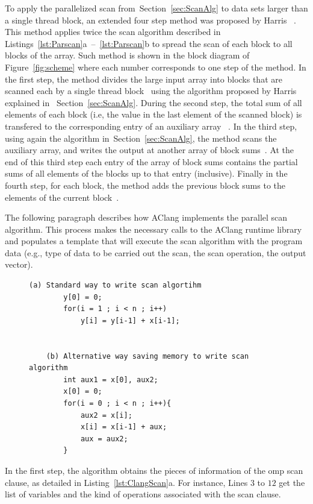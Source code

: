 \documentclass[Ingles]{ic-tese-v1}
\newcommand{\rsec}[1]{Section~\ref{sec:#1}}
\newcommand{\rfig}[1]{Figure~\ref{fig:#1}}
\newcommand{\rlst}[1]{Listing~\ref{lst:#1}}
\newcommand{\rlstn}[3]{Listings~\ref{lst:#1}{#2}~--~\ref{lst:#1}{#3}}
\begin{document}
To apply the  parallelized scan from~\rsec{ScanAlg} to data sets
larger than  a single thread block,  an extended four step  method was
proposed by Harris ~\cite{harris2007parallel}. This method applies twice the  scan
algorithm described in \rlstn{Parscan}{a}{b} to spread the scan of each
block to all blocks  of the array.  Such method is  shown in the block
diagram of \rfig{scheme} where each  number corresponds to one step of
the method.   In the first  step, the  method divides the  large input
array  into  blocks  that  are   scanned  each  by  a  single  thread
block~ using  the algorithm  proposed by Harris explained in ~\rsec{ScanAlg}.   During the
second step,  the total sum  of all elements  of each block  (i.e, the
value in the  last element of the scanned block)  is transfered to the
corresponding entry of  an auxiliary array ~.   In the third
step, using again  the algorithm in~\rsec{ScanAlg}, the  method scans the
auxiliary  array, and  writes the  output  at another  array of  block
sums~.  At  the end  of this  third step  each entry  of the
array of block  sums contains the partial sums of  all elements of the
blocks up to that entry (inclusive).   Finally in the fourth step,
for each block, the method adds the previous block sums  to the elements of the current
block~.

The following paragraph describes how AClang implements the parallel scan
algorithm. This process makes the necessary calls to the AClang runtime library
and populates a template that will execute the scan algorithm with the program
data (e.g., type of data to be carried out the scan, the scan operation, the
output vector).

\begin{figure}[t]
	\lstset{basicstyle=\scriptsize}
	\begin{lstlisting}[label=lst:ScanKind, caption={Pseudocode of Scan Parallel implementation in AClang}, escapeinside={}]
	(a) Standard way to write scan algortihm
		y[0] = 0;
		for(i = 1 ; i < n ; i++)
			y[i] = y[i-1] + x[i-1];


	(b) Alternative way saving memory to write scan algorithm
		int aux1 = x[0], aux2;
		x[0] = 0;
		for(i = 0 ; i < n ; i++){
			aux2 = x[i];
			x[i] = x[i-1] + aux;
			aux = aux2;
		}

	\end{lstlisting}
\end{figure}

In the first step, the algorithm obtains the pieces of information of the omp
scan clause, as detailed in \rlst{ClangScan}{a}. For
instance, Lines $3$ to $12$ get the list of variables and the kind of operations
associated with the scan clause.
\end{document}
